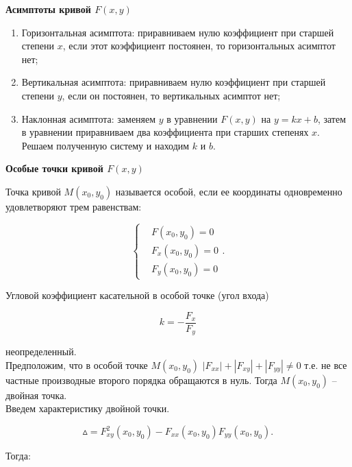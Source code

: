 \textbf{Асимптоты кривой $F \left( x, y \right)$}

\begin{enumerate}
	\item Горизонтальная асимптота: приравниваем нулю коэффициент при старшей степени $x$, если этот коэффициент постоянен, то горизонтальных асимптот нет;
	
	\item Вертикальная асимптота: приравниваем нулю коэффициент при старшей степени $y$, если он постоянен, то вертикальных асимптот нет;
	
	\item Наклонная асимптота: заменяем $y$ в уравнении $F \left( x, y \right)$ на $y = k x + b$, затем в уравнении  приравниваем два коэффициента при старших степенях $x$. Решаем полученную систему и находим $k$ и $b$.
\end{enumerate}

\textbf{Особые точки кривой $F \left( x, y \right)$}

Точка  кривой $M \left( x_{0}, y_{0} \right)$ называется особой, если ее координаты одновременно удовлетворяют трем равенствам:

\[
\begin{cases}
& F \left( x_{0}, y_{0} \right) = 0\\
& F_{x} \left( x_{0}, y_{0} \right) = 0\\
& F_{y} \left( x_{0}, y_{0} \right) = 0
\end{cases}.
\]

Угловой коэффициент касательной в особой точке (угол входа)

\[
k = - \frac{F_{x}}{F_{y}}
\]

неопределенный.\\

Предположим, что в особой точке $M \left( x_{0}, y_{0} \right)$ $\left| F_{xx} \right| + \left| F_{xy} \right| + \left| F_{yy} \right| \neq 0$ т.е. не все частные производные второго порядка обращаются в нуль. Тогда $M \left( x_{0}, y_{0} \right)$ -- двойная точка.\\

Введем характеристику двойной точки.

\[
\vartriangle = F^{2}_{xy} \left( x_{0}, y_{0} \right) - F_{xx} \left( x_{0}, y_{0} \right) F_{yy} \left( x_{0}, y_{0} \right).
\]

Тогда:

